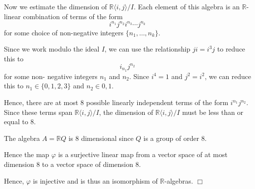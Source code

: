 \documentclass[10pt]{article}
\newenvironment{proof}[1][Proof]{\begin{trivlist}
\item[\hskip \labelsep {\bfseries #1}]}{\end{trivlist}}
\begin{document}
\begin{proof}
    Now we estimate the dimension of $\mathbb{R}\langle i,j\rangle/I$. Each
    element of this algebra is an $\mathbb{R}$-linear combination of terms of the form
    \begin{equation*}
        i^{n_1}j^{n_2}i^{n_3}\cdots j^{n_k}
    \end{equation*}
    for some choice of non-negative integers $\{n_1,\ldots,n_k\}$.
    
    Since we work modulo the ideal $I$, we can use the relationship $ji = i^3j$
    to reduce this to
    \begin{equation*}
        i_{n_1}j^{n_2}
    \end{equation*}
    for some non-
    negative integers $n_1$ and $n_2$. Since $i^4 = 1$ and $j^2 = i^2$,
    we can reduce this to $n_1\in \{0,1,2,3\}$ and $n_2\in {0,1}$.
    
    Hence, there are at most $8$ possible linearly independent terms of the form
    $i^{n_1}j^{n_2}$. Since these terms span $\mathbb{R}\langle i,j\rangle/I$, 
    the dimension of $\mathbb{R}\langle i,j\rangle/I$ must be less than or equal
    to $8$.
    
    The algebra $A = \mathbb{R}Q$ is $8$ dimensional since $Q$ is a group
    of order $8$.
    
    Hence the map $\varphi$ is a surjective linear map
    from a vector space of at most dimension $8$ to a vector
    space of dimension $8$.
    
    Hence, $\varphi$ is injective and is thus an isomorphism
    of $\mathbb{R}$-algebras. $\Box$
\end{proof}
\end{document}
